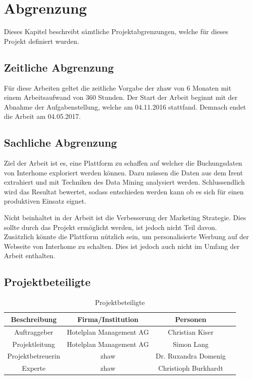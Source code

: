 \section{Abgrenzung}
\label{sec:einleitung:abgrenzung}
Dieses Kapitel beschreibt sämtliche Projektabgrenzungen, welche für dieses Projekt definiert
wurden.

\subsection{Zeitliche Abgrenzung}
Für diese Arbeiten geltet die zeitliche Vorgabe der \gls{zhaw} von 6 Monaten mit einem Arbeitsaufwand von 360 Stunden.
Der Start der Arbeit beginnt mit der Abnahme der Aufgabenstellung, welche am 04.11.2016 stattfand.
Demnach endet die Arbeit am 04.05.2017.

\subsection{Sachliche Abgrenzung}
Ziel der Arbeit ist es, eine Plattform zu schaffen auf welcher die Buchungsdaten von Interhome exploriert werden können. Dazu müssen die Daten aus dem Irent extrahiert und mit Techniken des Data Mining analysiert werden. Schlussendlich wird das Resultat bewertet, sodass entschieden werden kann ob es sich für einen produktiven Einsatz eignet.

Nicht beinhaltet in der Arbeit ist die Verbesserung der Marketing Strategie. Dies sollte durch das Projekt ermöglicht werden, ist jedoch nicht Teil davon. Zusätzlich könnte die Plattform nützlich sein, um personalisierte Werbung auf der Webseite von Interhome zu schalten. Dies ist jedoch auch nicht im Umfang der Arbeit enthalten.

\subsection{Projektbeteiligte}
\begin{table}[H] 
	\caption{Projektbeteiligte}
	\centering
	
	\begin{tabular}{ | c | c | c | c |} 
		\hline 
		\rowcolor{tableheadcolor}
		\bfseries Beschreibung & 
		\bfseries Firma/Institution & 
		\bfseries Personen \\ \hline 
		Auftraggeber & Hotelplan Management AG & Christian Kiser \\ \hline 
		Projektleitung & Hotelplan Management AG & Simon Lang\\ \hline 
		Projektbetreuerin &  \gls{zhaw} & Dr. Ruxandra Domenig \\ \hline 
		Experte & \gls{zhaw} & Christioph Burkhardt \\ \hline 
	\end{tabular} 
\end{table}

